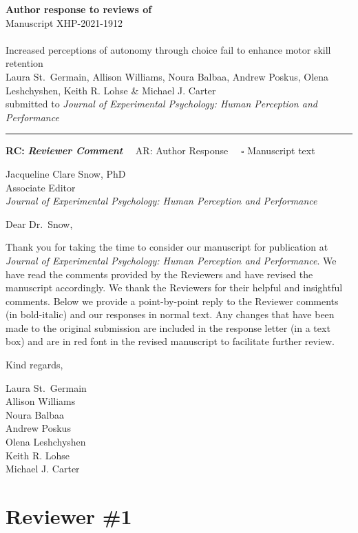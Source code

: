 \documentclass[final]{article}
\begin{document}
{\Large\bf Author response to reviews of}\\[1em]
Manuscript XHP-2021-1912\\ \\
{\Large Increased perceptions of autonomy through choice fail to enhance motor skill retention}\\[1em]
{Laura St.~Germain, Allison Williams, Noura Balbaa, Andrew Poskus, Olena Leshchyshen, Keith R. Lohse \& Michael J. Carter}\\
{submitted to \it Journal of Experimental Psychology: Human Perception and Performance }\\
\hrule

\hfill {\bfseries RC:} \textbf{\textit{Reviewer Comment}}\(\quad\) AR: Author Response \(\quad\square\) Manuscript text

\vspace{2em}

Jacqueline Clare Snow, PhD\\
Associate Editor\\
\emph{Journal of Experimental Psychology: Human Perception and Performance}

Dear Dr.~Snow,

Thank you for taking the time to consider our manuscript for publication at \emph{Journal of Experimental Psychology: Human Perception and Performance}. We have read the comments provided by the Reviewers and have revised the manuscript accordingly. We thank the Reviewers for their helpful and insightful comments. Below we provide a point-by-point reply to the Reviewer comments (in bold-italic) and our responses in normal text. Any changes that have been made to the original submission are included in the response letter (in a text box) and are in red font in the revised manuscript to facilitate further review.

Kind regards,

Laura St.~Germain\\
Allison Williams\\
Noura Balbaa\\
Andrew Poskus\\
Olena Leshchyshen\\
Keith R. Lohse\\
Michael J. Carter

\hypertarget{reviewer-1}{%
\section{Reviewer \#1}\label{reviewer-1}}
\end{document}
